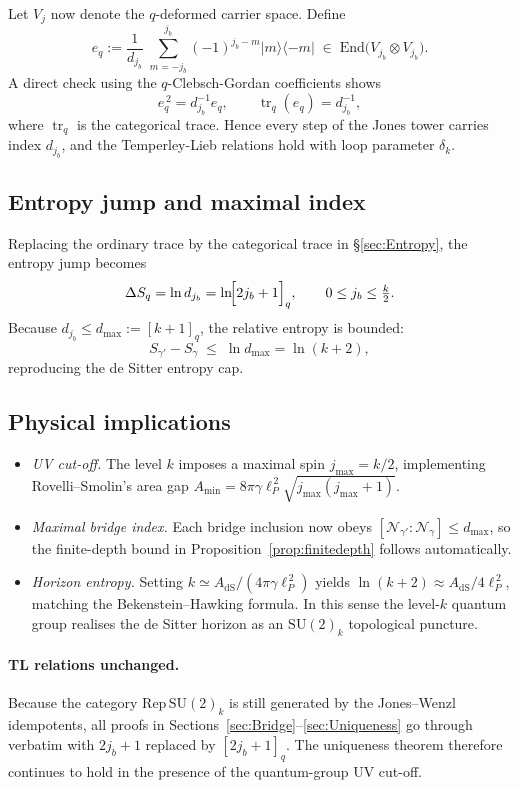 \documentclass[11pt]{article}
\begin{document}
Let $V_j$ now denote the $q$-deformed carrier space.
Define
\[
  e_q
  :=
  \frac{1}{d_{j_b}}\;
  \sum_{m=-j_b}^{j_b}
     (-1)^{j_b-m}
     |m\rangle\!\langle{-m}|
     \;\in\;
     \mathrm{End}\bigl(V_{j_b}\!\otimes\!V_{j_b}\bigr).
\]
A direct check using the $q$-Clebsch-Gordan coefficients shows
\[
  e_q^{\,2}=d_{j_b}^{-1}e_q,
  \qquad
  \operatorname{tr}_q(e_q)=d_{j_b}^{-1},
\]
where $\operatorname{tr}_q$ is the categorical trace.  Hence every step of
the Jones tower carries index $d_{j_b}$, and the Temperley-Lieb relations
hold with loop parameter $\delta_k$.

\subsection{Entropy jump and maximal index}

Replacing the ordinary trace by the categorical trace in
\S\ref{sec:Entropy}, the entropy jump becomes
\[
  \Delta S_q
  =\ln d_{j_b}
  =\ln\!\Bigl[2j_b+1\Bigr]_q,
\qquad
  0\le j_b\le\tfrac{k}{2}.
\]
Because $d_{j_b}\le d_{\max}:=[k+1]_q$, the relative entropy is bounded:
\[
  S_{\gamma'}-S_{\gamma}
  \;\le\;
  \ln d_{\max}
  =\ln(k+2),
\]
reproducing the de Sitter entropy cap.

\subsection{Physical implications}

\begin{itemize}
\item \emph{UV cut-off.}  
  The level $k$ imposes a maximal spin $j_{\max}=k/2$, implementing
  Rovelli–Smolin’s area gap
  $A_{\min}=8\pi\gamma\ell_P^{\,2}\sqrt{j_{\max}(j_{\max}+1)}$.
\item \emph{Maximal bridge index.}  
  Each bridge inclusion now obeys
  $[\mathcal N_{\gamma'}:\mathcal N_{\gamma}]\le d_{\max}$,
  so the finite-depth bound in
  Proposition~\ref{prop:finitedepth} follows automatically.
\item \emph{Horizon entropy.}
  Setting $k\simeq A_{\text{dS}}/(4\pi\gamma\ell_P^{\,2})$ yields
  $\ln(k+2)\approx A_{\text{dS}}/4\ell_P^{\,2}$,
  matching the Bekenstein–Hawking formula.
  In this sense the level-$k$ quantum group realises the de Sitter 
  horizon as an $\mathrm{SU}(2)_k$ topological puncture.
\end{itemize}

\paragraph{TL relations unchanged.}
Because the category $\mathrm{Rep}\,\mathrm{SU}(2)_k$ is still generated
by the Jones–Wenzl idempotents,
all proofs in Sections~\ref{sec:Bridge}–\ref{sec:Uniqueness} go through
verbatim with $2j_b+1$ replaced by $[2j_b+1]_q$.
The uniqueness theorem therefore continues to hold in the presence of the
quantum-group UV cut-off.
\end{document}
